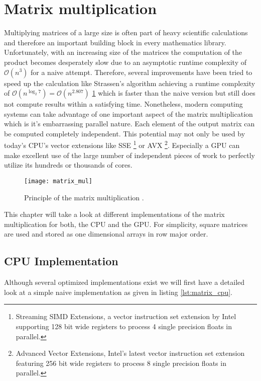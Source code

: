 \section{Matrix multiplication}

Multiplying matrices of a large size is often part of heavy scientific calculations and therefore an important building block in every mathematics library. Unfortunately, with an increasing size of the matrices the computation of the product becomes desperately slow due to an asymptotic runtime complexity of $\mathcal{O}(n^3)$ for a naive attempt. Therefore, several improvements have been tried to speed up the calculation like Strassen's algorithm achieving a runtime complexity of $\mathcal{O}(n^{\log_2 7}) = \mathcal{O}(n^{2.807})$ \ref{} which is faster than the naive version but still does not compute results within a satisfying time.
Nonetheless, modern computing systems can take advantage of one important aspect of the matrix multiplication which is it's embarrassing parallel nature. Each element of the output matrix can be computed completely independent. This potential may not only be used by today's CPU's vector extensions like SSE \footnote{Streaming SIMD Extensions, a vector instruction set extension by Intel supporting 128 bit wide registers to process 4 single precision floats in parallel.} or AVX \footnote{Advanced Vector Extensions, Intel's latest vector instruction set extension featuring 256 bit wide registers to process 8 single precision floats in parallel.}. Especially a GPU can make excellent use of the large number of independent pieces of work to perfectly utilize its hundreds or thousands of cores.

\begin{figure}
\centering
\texttt{[image: matrix\_mul]}
\caption{Principle of the matrix multiplication \cite{wiki_matrix_mul}.}
\label{fig:matrix_mul}
\end{figure}

This chapter will take a look at different implementations of the matrix multiplication for both, the CPU and the GPU. For simplicity, square matrices are used and stored as one dimensional arrays in row major order.

\subsection{CPU Implementation}
\label{sec:matrix_cpu_implementation}

Although several optimized implementations exist we will first have a detailed look at a simple naive implementation as given in listing \ref{lst:matrix_cpu}.

